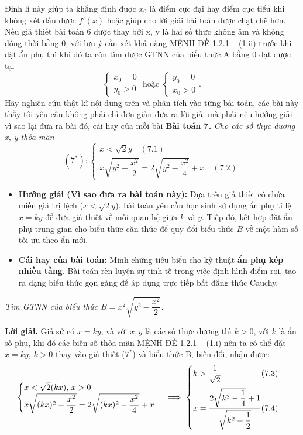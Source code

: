 \documentclass[12pt]{report}
\begin{document}
\vspace{0.2cm}
\noindent Định lí này giúp ta khẳng định được $x_0$ là điểm cực đại hay điểm cực tiểu khi không xét dấu được $f'(x)$ hoặc giúp cho lời giải bài toán được chặt chẽ hơn. Nếu
\noindent giả thiết bài toán 6 được thay bởi x, y là hai số thực không âm và không đồng thời bằng 0, với lưu ý cần xét khả năng MỆNH ĐỀ 1.2.1 -- (1.ii) trước khi đặt ẩn phụ thì khi đó ta còn tìm được GTNN của biểu thức A bằng 0 đạt được tại
\[
\begin{cases} x_0 = 0 \\ y_0 > 0 \end{cases} \text{ hoặc } \begin{cases} y_0 = 0 \\ x_0 > 0 \end{cases}.
\]
Hãy nghiên cứu thật kĩ nội dung trên và phân tích vào từng bài toán, các bài này thầy tôi yêu cầu không phải chỉ đơn giản đưa ra lời giải mà phải nêu hướng giải vì sao lại đưa ra bài đó, cái hay của mỗi bài
\vspace{0.4cm}
\noindent \textbf{Bài toán 7.} \textit{Cho các số thực dương x, y thỏa mãn}
\[
(7^*): \begin{cases}
x < \sqrt{2}y \quad (7.1) \\
x\sqrt{y^2 - \dfrac{x^2}{2}} = 2\sqrt{y^2 - \dfrac{x^2}{4}} + x \quad (7.2)
\end{cases}
\]

\begin{itemize}
    \item[\textbf{1.}] \textbf{Hướng giải (Vì sao đưa ra bài toán này):} 
    Dựa trên giả thiết có chứa miền giá trị lệch ($x < \sqrt{2}y$), bài toán yêu cầu học sinh sử dụng ẩn phụ tỉ lệ $x = ky$ để đưa giả thiết về mối quan hệ giữa $k$ và $y$. Tiếp đó, kết hợp đặt ẩn phụ trung gian cho biểu thức căn thức để quy đổi biểu thức $B$ về một hàm số tối ưu theo ẩn mới.

    \item[\textbf{2.}] \textbf{Cái hay của bài toán:} 
    Minh chứng tiêu biểu cho kỹ thuật \textbf{ẩn phụ kép nhiều tầng}. Bài toán rèn luyện sự tinh tế trong việc định hình điểm rơi, tạo ra dạng biểu thức gọn gàng để áp dụng trực tiếp bất đẳng thức Cauchy.
\end{itemize}
\vspace{0.2cm}
\noindent \textit{Tìm GTNN của biểu thức $B = x^2\sqrt{y^2 - \dfrac{x^2}{2}}$.}

\vspace{0.3cm}
\noindent \textbf{Lời giải.} Giả sử có $x = ky$, và với $x, y$ là các số thực dương thì $k > 0$, với $k$ là ẩn số phụ, khi đó các biến số thỏa mãn MỆNH ĐỀ 1.2.1 -- (1.i) nên ta có thể đặt $x = ky$, $k > 0$ thay vào giả thiết ($7^*$) và biểu thức B, biến đổi, nhận được:
\[
\begin{cases}
x < \sqrt{2}(kx), \, x > 0 \\
x\sqrt{(kx)^2 - \dfrac{x^2}{2}} = 2\sqrt{(kx)^2 - \dfrac{x^2}{4}} + x
\end{cases}
\implies \begin{cases}
k > \dfrac{1}{\sqrt{2}} \hfill (7.3) \\[10pt]
x = \dfrac{2\sqrt{k^2 - \dfrac{1}{4}} + 1}{\sqrt{k^2 - \dfrac{1}{2}}} \hfill (7.4)
\end{cases}
\]
\end{document}
